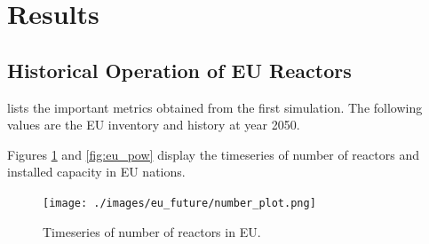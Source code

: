\section{Results}

\subsection{Historical Operation of \gls{EU} Reactors}


\begin{table}[h]
	\centering
		\caption{Simulation Results for Historical Nuclear Operation of \gls{EU} Nations}
		\label{tab:sim_result}
		\end {table}

 lists the important metrics
obtained from the first simulation. The following
values are the \gls{EU} inventory and history at year 2050.

Figures \ref{fig:eu_num} and \ref{fig:eu_pow} display the
timeseries of number of reactors and installed capacity in \gls{EU} nations.


\begin{figure}[htbp!]
	\begin{center}
		\texttt{[image: ./images/eu\_future/number\_plot.png]}
	\end{center}
	\caption{Timeseries of number of reactors in \gls{EU}.}
	\label{fig:eu_num}
\end{figure}


